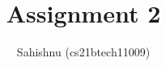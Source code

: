 \documentclass[journal,12pt,twocolumn]{IEEEtran}
\begin{document}
\let\vec\mathbf
\def\putbox#1#2#3{\makebox[0in][l]{\makebox[#1][l]{}\raisebox{\baselineskip}[0in][0in]{\raisebox{#2}[0in][0in]{#3}}}}
     \def\rightbox#1{\makebox[0in][r]{#1}}
     \def\centbox#1{\makebox[0in]{#1}}
     \def\topbox#1{\raisebox{-\baselineskip}[0in][0in]{#1}}
     \def\midbox#1{\raisebox{-0.5\baselineskip}[0in][0in]{#1}}
\title{
	Assignment 2
}
\author{ Sahishnu (cs21btech11009)%
}
\graphicspath{{figures/}}
%
%
%
% 
%
\end{document}
